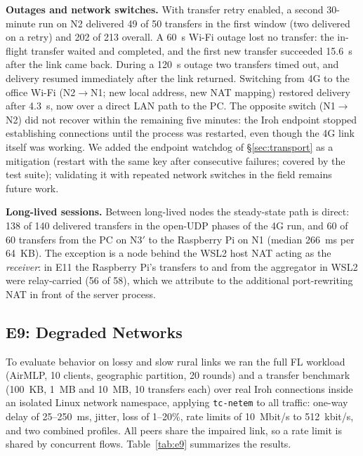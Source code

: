 \textbf{Outages and network switches.} With transfer retry enabled, a second 30-minute run on N2 delivered 49 of 50 transfers in the first window (two delivered on a retry) and 202 of 213 overall. A 60~s Wi-Fi outage lost no transfer: the in-flight transfer waited and completed, and the first new transfer succeeded 15.6~s after the link came back. During a 120~s outage two transfers timed out, and delivery resumed immediately after the link returned. Switching from 4G to the office Wi-Fi (N2$\to$N1; new local address, new NAT mapping) restored delivery after 4.3~s, now over a direct LAN path to the PC. The opposite switch (N1$\to$N2) did not recover within the remaining five minutes: the Iroh endpoint stopped establishing connections until the process was restarted, even though the 4G link itself was working. We added the endpoint watchdog of \S\ref{sec:transport} as a mitigation (restart with the same key after consecutive failures; covered by the test suite); validating it with repeated network switches in the field remains future work.

\textbf{Long-lived sessions.} Between long-lived nodes the steady-state path is direct: 138 of 140 delivered transfers in the open-UDP phases of the 4G run, and 60 of 60 transfers from the PC on N3$'$ to the Raspberry Pi on N1 (median 266~ms per 64~KB). The exception is a node behind the WSL2 host NAT acting as the \emph{receiver}: in E11 the Raspberry Pi's transfers to and from the aggregator in WSL2 were relay-carried (56 of 58), which we attribute to the additional port-rewriting NAT in front of the server process.

\subsection{E9: Degraded Networks}
\label{sec:e9}

To evaluate behavior on lossy and slow rural links we ran the full FL workload (AirMLP, 10 clients, geographic partition, 20 rounds) and a transfer benchmark (100~KB, 1~MB and 10~MB, 10 transfers each) over real Iroh connections inside an isolated Linux network namespace, applying \texttt{tc-netem} to all traffic: one-way delay of 25--250~ms, jitter, loss of 1--20\%, rate limits of 10~Mbit/s to 512~kbit/s, and two combined profiles. All peers share the impaired link, so a rate limit is shared by concurrent flows. Table~\ref{tab:e9} summarizes the results.

